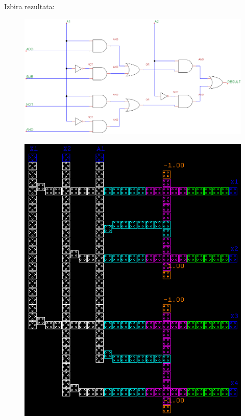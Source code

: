 \documentclass[seminar, slovene]{FRIreport}
\begin{document}
\begin{minipage}[H]{16cm}
Izbira rezultata:\\
\begin{center}
\begin{figure}[H]
\begin{center}
\includegraphics[width=12cm]{vezja/img/mux}
\end{center}
\end{figure}
\begin{figure}[H]
\begin{center}
\includegraphics[width=13cm]{qca/img/mux}
\end{center}
\end{figure}
\end{center}
\end{minipage}
\end{document}
